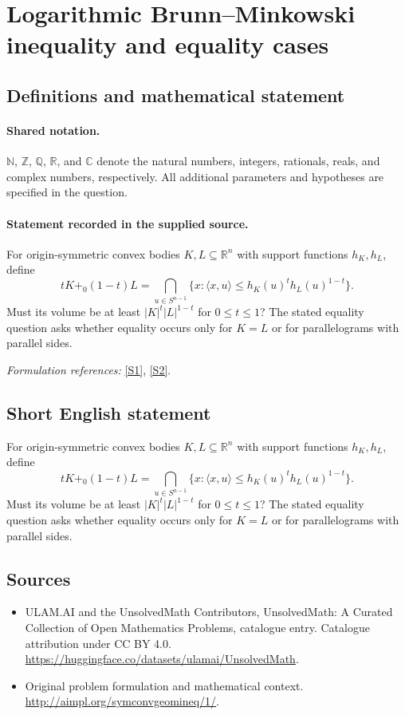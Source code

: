 \documentclass[11pt]{article}
\newcommand{\sref}[2]{\hyperlink{source:#1:#2}{[S#2]}}
\begin{document}
\section{Logarithmic Brunn–Minkowski inequality and equality cases}\label{statement}

\subsection{Definitions and mathematical statement}

\paragraph{Shared notation.}$\mathbb N$, $\mathbb Z$, $\mathbb Q$, $\mathbb R$, and $\mathbb C$ denote the natural numbers, integers, rationals, reals, and complex numbers, respectively. All additional parameters and hypotheses are specified in the question.


\paragraph{Statement recorded in the supplied source.}
For origin-symmetric convex bodies $K,L\subseteq\mathbb R^n$ with support functions $h_K,h_L$, define
\[tK+_0(1-t)L=\bigcap_{u\in S^{n-1}}\{x:\langle x,u\rangle\leq h_K(u)^th_L(u)^{1-t}\}.\]
Must its volume be at least $|K|^t|L|^{1-t}$ for $0\leq t\leq1$? The stated equality question asks whether equality occurs only for $K=L$ or for parallelograms with parallel sides.
\par\smallskip\textit{Formulation references:} \sref{statement}{1}, \sref{statement}{2}.
\subsection{Short English statement}
For origin-symmetric convex bodies $K,L\subseteq\mathbb R^n$ with support functions $h_K,h_L$, define
\[tK+_0(1-t)L=\bigcap_{u\in S^{n-1}}\{x:\langle x,u\rangle\leq h_K(u)^th_L(u)^{1-t}\}.\]
Must its volume be at least $|K|^t|L|^{1-t}$ for $0\leq t\leq1$? The stated equality question asks whether equality occurs only for $K=L$ or for parallelograms with parallel sides.
\subsection{Sources}
\begin{itemize}
\item[\hypertarget{source:statement:1}{S1}] ULAM.AI and the UnsolvedMath Contributors, UnsolvedMath: A Curated Collection of Open Mathematics Problems, catalogue entry. Catalogue attribution under CC BY 4.0.
\url{https://huggingface.co/datasets/ulamai/UnsolvedMath}.
\item[\hypertarget{source:statement:2}{S2}] Original problem formulation and mathematical context.
\url{http://aimpl.org/symconvgeomineq/1/}.
\end{itemize}
\label{end:statement}
\end{document}
